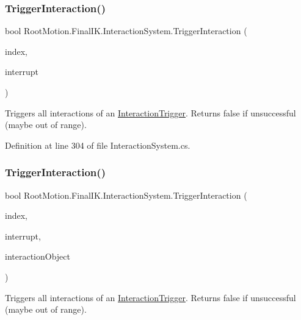 \subsubsection{\texorpdfstring{Trigger\+Interaction()}{TriggerInteraction()}\hspace{0.1cm}{\footnotesize\ttfamily [1/3]}}
{\footnotesize\ttfamily bool Root\+Motion.\+Final\+I\+K.\+Interaction\+System.\+Trigger\+Interaction (\begin{DoxyParamCaption}\item[{int}]{index,  }\item[{bool}]{interrupt }\end{DoxyParamCaption})}



Triggers all interactions of an \mbox{\hyperlink{class_root_motion_1_1_final_i_k_1_1_interaction_trigger}{Interaction\+Trigger}}. Returns false if unsuccessful (maybe out of range). 



Definition at line 304 of file Interaction\+System.\+cs.

\mbox{\label{class_root_motion_1_1_final_i_k_1_1_interaction_system_a270081b8d7c79351b4f3911f02dc12cb}} 
\subsubsection{\texorpdfstring{Trigger\+Interaction()}{TriggerInteraction()}\hspace{0.1cm}{\footnotesize\ttfamily [2/3]}}
{\footnotesize\ttfamily bool Root\+Motion.\+Final\+I\+K.\+Interaction\+System.\+Trigger\+Interaction (\begin{DoxyParamCaption}\item[{int}]{index,  }\item[{bool}]{interrupt,  }\item[{out \mbox{\hyperlink{class_root_motion_1_1_final_i_k_1_1_interaction_object}{Interaction\+Object}}}]{interaction\+Object }\end{DoxyParamCaption})}



Triggers all interactions of an \mbox{\hyperlink{class_root_motion_1_1_final_i_k_1_1_interaction_trigger}{Interaction\+Trigger}}. Returns false if unsuccessful (maybe out of range). 



